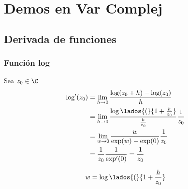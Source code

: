 \section{Demos en Var Complej} %

\subsection{Derivada de funciones} %

\subsubsection{Función log} %
Sea $z_0 \in \C$
\begin{equation}
\begin{split}
    \log'(z_0) &= \lim_{h \to 0}\frac{\log(z_0 + h) - \log(z_0)}{h}\\
            &= \lim_{h \to 0}\frac{\log\lados{(}{1 + \frac{h}{z_0}}}{\frac{h}{z_0}}\frac{1}{z_0}\\
            &= \lim_{w \to 0}\frac{w}{\exp(w) - \exp(0)}\frac{1}{z_0}\\
            &= \frac{1}{z_0}\frac{1}{\exp'(0)} = \frac{1}{z_0}
\end{split}
\nonumber
\end{equation}

\[w = \log\lados{(}{1 + \frac{h}{z_0}}\]
